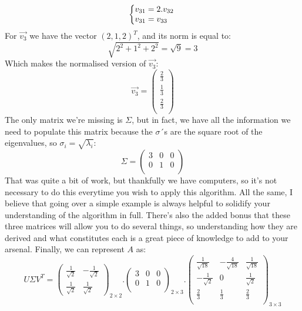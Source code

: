 \documentclass[a4,12pt,twosided,openany]{memoir}
\begin{document}
\[\left\{\begin{array}{@{}l@{}}
   v_{31} = 2.v_{32} \\
   v_{31} = v_{33} \\
  \end{array}\right.\,\]
For $\overrightarrow{v_3}$ we have the vector $(2,1,2)^T$, and its norm is equal to:
\[\sqrt{2^2 + 1^2 + 2^2} = \sqrt{9} = 3\]
Which makes the normalised version of $\overrightarrow{v_3}$:
\[
\overrightarrow{v_3} = \begin{pmatrix}
\frac{2}{3}\\
\frac{1}{3}\\
\frac{2}{3}\\
\end{pmatrix}
\]
The only matrix we’re missing is $\Sigma$, but in fact, we have all the information we need to populate this matrix because the $\sigma$´s are the square root of the eigenvalues, so $\sigma_i = \sqrt{\lambda_i}$:
\[
\Sigma = \begin{pmatrix}
3 & 0 & 0\\
0 & 1 & 0 \\
\end{pmatrix}
\]
That was quite a bit of work, but thankfully we have computers, so it’s not necessary to do this everytime you wish to apply this algorithm. All the same, I believe that going over a simple example is always helpful to solidify  your understanding of the algorithm in full. There’s also the added bonus that these three matrices will allow you to do several things, so understanding  how they are derived and what constitutes each is a great piece of knowledge to add to your arsenal. Finally, we can represent $A$ as:
\[U \Sigma V^T = \begin{pmatrix}
\frac{1}{\sqrt{2}} & -\frac{1}{\sqrt{2}} \\
\frac{1}{\sqrt{2}} & \frac{1}{\sqrt{2}}
\end{pmatrix}_{2 \times 2}.\begin{pmatrix}
3 & 0 & 0\\
0 & 1 & 0 \\
\end{pmatrix}_{2\times 3}.
\begin{pmatrix}
\frac{1}{\sqrt{18}} &-\frac{4}{\sqrt{18}} & \frac{1}{\sqrt{18}}\\
 -\frac{1}{\sqrt{2}}   & 0 & \frac{1}{\sqrt{2}} \\
 \frac{2}{3} &\frac{1}{3} & \frac{2}{3}\\
\end{pmatrix}_{3 \times 3}
\]
\end{document}
